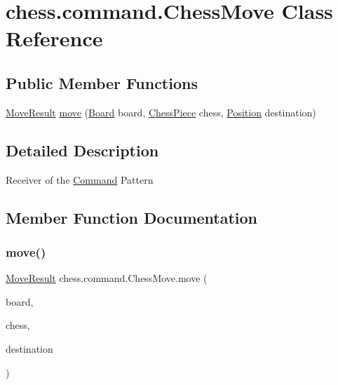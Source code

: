 \hypertarget{classchess_1_1command_1_1_chess_move}{}\section{chess.\+command.\+Chess\+Move Class Reference}
\label{classchess_1_1command_1_1_chess_move}
\subsection*{Public Member Functions}
\begin{DoxyCompactItemize}
\item 
\mbox{\hyperlink{enumchess_1_1models_1_1enums_1_1_move_result}{Move\+Result}} \mbox{\hyperlink{classchess_1_1command_1_1_chess_move_a9d123dab6ec00e09fd72790dae809197}{move}} (\mbox{\hyperlink{classchess_1_1models_1_1_board}{Board}} board, \mbox{\hyperlink{classchess_1_1models_1_1_chess_piece}{Chess\+Piece}} chess, \mbox{\hyperlink{classchess_1_1models_1_1_position}{Position}} destination)
\end{DoxyCompactItemize}


\subsection{Detailed Description}
Receiver of the \mbox{\hyperlink{interfacechess_1_1command_1_1_command}{Command}} Pattern 

\subsection{Member Function Documentation}
\mbox{\label{classchess_1_1command_1_1_chess_move_a9d123dab6ec00e09fd72790dae809197}} 
\subsubsection{\texorpdfstring{move()}{move()}}
{\footnotesize\ttfamily \mbox{\hyperlink{enumchess_1_1models_1_1enums_1_1_move_result}{Move\+Result}} chess.\+command.\+Chess\+Move.\+move (\begin{DoxyParamCaption}\item[{\mbox{\hyperlink{classchess_1_1models_1_1_board}{Board}}}]{board,  }\item[{\mbox{\hyperlink{classchess_1_1models_1_1_chess_piece}{Chess\+Piece}}}]{chess,  }\item[{\mbox{\hyperlink{classchess_1_1models_1_1_position}{Position}}}]{destination }\end{DoxyParamCaption})}

